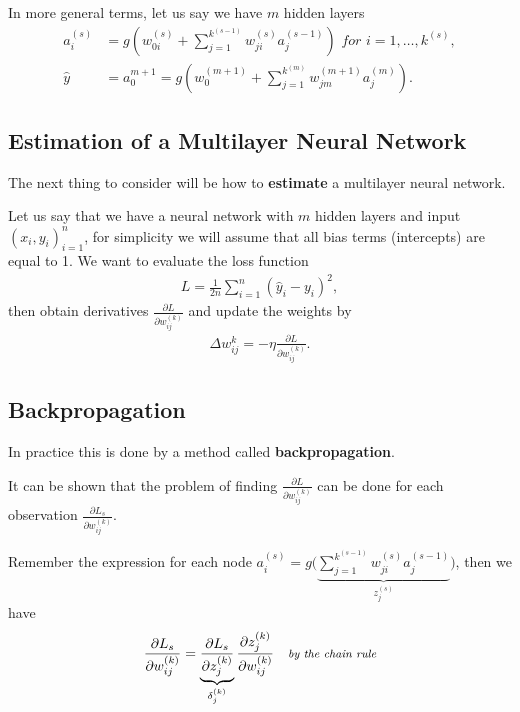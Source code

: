 \documentclass[aspectratio=169,10pt]{beamer}
\begin{document}
\begin{frame}{\secname}{\subsecname}
  In more general terms, let us say we have $m$ hidden layers
  \begin{align}
    a_i^{(s)} &= g \left(w_{0i}^{(s)} + \sum_{j=1}^{k^{(s-1)}} w_{ji}^{(s)}a_j^{(s-1)} \right) \textit{ for } i = 1, \ldots, k^{(s)}, \\
    \hat{y} &= a_0^{m+1} = g \left(w_0^{(m+1)} + \sum_{j=1}^{k^{(m)}} w_{jm}^{(m+1)}a_j^{(m)}\right).
  \end{align}
\end{frame}

\subsection{Estimation of a Multilayer Neural Network}
\begin{frame}{\secname}{\subsecname}
  The next thing to consider will be how to \textbf{estimate} a multilayer neural network.

  Let us say that we have a neural network with $m$ hidden layers and input $(x_i,y_i)_{i=1}^n$, for simplicity we will assume that all bias terms (intercepts) are equal to 1.
  We want to evaluate the loss function
  \begin{align}
    L = \frac{1}{2n} \sum_{i=1}^n (\hat{y}_i - y_i)^2,
  \end{align}
  then obtain derivatives $\frac{\partial L }{\partial w_{ij}^{(k)}}$ and update the weights by
  \begin{align}
    \Delta w_{ij}^k = - \eta \frac{\partial L}{\partial w_{ij}^{(k)}}.
  \end{align}
\end{frame}

\subsection{Backpropagation}
\begin{frame}{\secname}{\subsecname}
  In practice this is done by a method called \textbf{backpropagation}.

  It can be shown that the problem of finding $\frac{\partial L}{\partial w_{ij}^{(k)}}$ can be done for each observation $\frac{\partial L_s}{\partial w_{ij}^{(k)}}$.

  Remember the expression for each node $a_i^{(s)} = g \bigg(\underbrace{\sum_{j=1}^{k^{(s-1)}} w_{ji}^{(s)}a_j^{(s-1)}}_{z_j^{(s)}} \bigg)$, then we have
  \begin{align}
    \frac{\partial L_s}{\partial w_{ij}^{(k)}} = \underbrace{\frac{\partial L_s}{ \partial z_j^{(k)}}}_{\delta_j^{(k)}} \frac{\partial z_j^{(k)}}{\partial w_{ij}^{(k)}} \quad {\footnotesize \textit{by the chain rule}}
  \end{align}
\end{frame}
\end{document}
